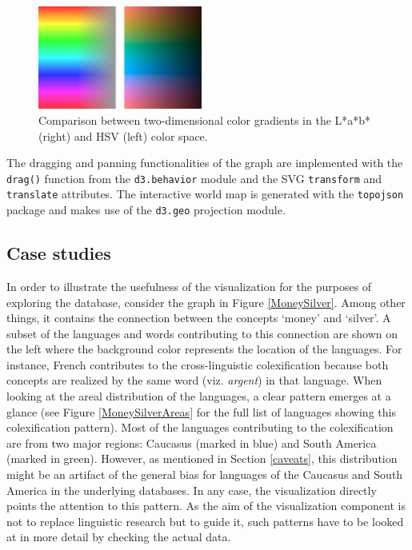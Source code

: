 \begin{figure}[h]
    \centering
   \includegraphics[width=0.48\textwidth]{img/Lab_HSV2.png}
    \caption{Comparison between two-dimensional color gradients in the L*a*b* (right) and HSV (left)
    color space.}
    \label{lab vs hsv}
\end{figure}


The  dragging and panning functionalities of the graph are implemented with the \texttt{drag()} function from the \texttt{d3.behavior} module and the SVG \texttt{transform} and \texttt{translate} attributes. The interactive world map is generated with the \texttt{topojson} package and makes use of the \texttt{d3.geo} projection module.

\subsection{Case studies} \label{case study}

In order to illustrate the usefulness of the visualization for the purposes of exploring the database, consider the graph in Figure \ref{MoneySilver}. Among other things, it contains the connection between the concepts `money' and `silver'. A subset of the languages and words contributing to this connection are shown on the left where the background color represents the location of the languages. For instance, French contributes to the cross-linguistic colexification because both concepts are realized by the same word (viz. \textit{argent}) in that language. When looking at the areal distribution of the languages, a clear pattern emerges at a glance (see Figure \ref{MoneySilverAreas} for the full list of languages showing this colexification pattern). Most of the languages contributing to the colexification are from two major regions: Caucasus (marked in blue) and South America (marked in green). However, as mentioned in Section \ref{caveats}, this distribution might be an artifact of the general bias for languages of the Caucasus and South America in the underlying databases. In any case, the visualization directly points the attention to this pattern. As the  aim of the visualization component is not to replace linguistic research but to guide it, such patterns have to be looked at in more detail by checking the actual data. 

